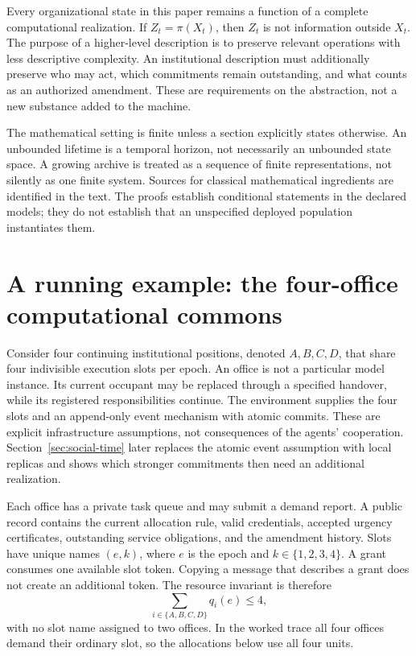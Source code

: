 \documentclass[11pt,letterpaper]{article}
\theoremstyle{plain}
\theoremstyle{definition}
\theoremstyle{remark}
\begin{document}
Every organizational state in this paper remains a function of a complete computational realization. If $Z_t=\pi(X_t)$, then $Z_t$ is not information outside $X_t$. The purpose of a higher-level description is to preserve relevant operations with less descriptive complexity. An institutional description must additionally preserve who may act, which commitments remain outstanding, and what counts as an authorized amendment. These are requirements on the abstraction, not a new substance added to the machine.

The mathematical setting is finite unless a section explicitly states otherwise. An unbounded lifetime is a temporal horizon, not necessarily an unbounded state space. A growing archive is treated as a sequence of finite representations, not silently as one finite system. Sources for classical mathematical ingredients are identified in the text. The proofs establish conditional statements in the declared models; they do not establish that an unspecified deployed population instantiates them.


\section{A running example: the four-office computational commons}\label{sec:commons}
Consider four continuing institutional positions, denoted $A,B,C,D$, that share four indivisible execution slots per epoch. An office is not a particular model instance. Its current occupant may be replaced through a specified handover, while its registered responsibilities continue. The environment supplies the four slots and an append-only event mechanism with atomic commits. These are explicit infrastructure assumptions, not consequences of the agents' cooperation. Section~\ref{sec:social-time} later replaces the atomic event assumption with local replicas and shows which stronger commitments then need an additional realization.

Each office has a private task queue and may submit a demand report. A public record contains the current allocation rule, valid credentials, accepted urgency certificates, outstanding service obligations, and the amendment history. Slots have unique names $(e,k)$, where $e$ is the epoch and $k\in\{1,2,3,4\}$. A grant consumes one available slot token. Copying a message that describes a grant does not create an additional token. The resource invariant is therefore
\[
\sum_{i\in\{A,B,C,D\}}q_i(e)\leq4,
\]
with no slot name assigned to two offices. In the worked trace all four offices demand their ordinary slot, so the allocations below use all four units.
\end{document}

